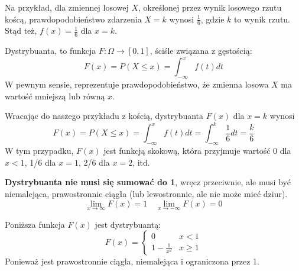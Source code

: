 \documentclass{../notatki}
\begin{document}
\begin{examplebox}
  Na przykład, dla zmiennej losowej $X$, określonej przez wynik losowego
  rzutu koścą, prawdopodobieństwo zdarzenia $X = k$ wynosi
  $\frac{1}{6}$, gdzie $k$ to wynik rzutu. Stąd też, $f(x) =
  \frac{1}{6}$ dla $x = k$.
\end{examplebox}

Dystrybuanta, to funkcja $F: \Omega \to [0, 1]$, ściśle związana z gęstością:
$$
F(x) = P(X \leq x) = \int_{-\infty}^x f(t) dt
$$
W pewnym sensie, reprezentuje prawdopodobieństwo, że zmienna losowa
$X$ ma wartość mniejszą lub równą $x$.

\begin{examplebox}
  Wracając do naszego przykładu z kością, dystrybuanta $F(x)$ dla $x = k$ wynosi
  $$
  F(x) = P(X \leq x) = \int_{-\infty}^x f(t) dt = \int_{-\infty}^k
  \frac{1}{6} dt = \frac{k}{6}
  $$
  W tym przypadku, $F(x)$ jest funkcją skokową, która przyjmuje
  wartość 0 dla $x < 1$, 1/6 dla $x = 1$, 2/6 dla $x = 2$, itd.
\end{examplebox}
\textbf{Dystrybuanta nie musi się sumować do 1}, wręcz przeciwnie, ale musi być
niemalejąca, prawostronnie ciągła (lub lewostronnie, ale nie może mieć dziur).
$$
\lim_{x \to \infty} F(x) = 1 \quad \lim_{x \to -\infty} F(x) = 0
$$

\begin{examplebox}
  Poniższa funkcja $F(x)$ jest dystrybuantą:
  $$
  F(x) =
  \begin{cases}
    0 & x < 1 \\
    1 - \frac{1}{x^2} & x \geq 1
  \end{cases}
  $$
  Ponieważ jest prawostronnie ciągla, niemalejąca i ograniczona przez 1.

  \centering
\end{examplebox}
\end{document}
